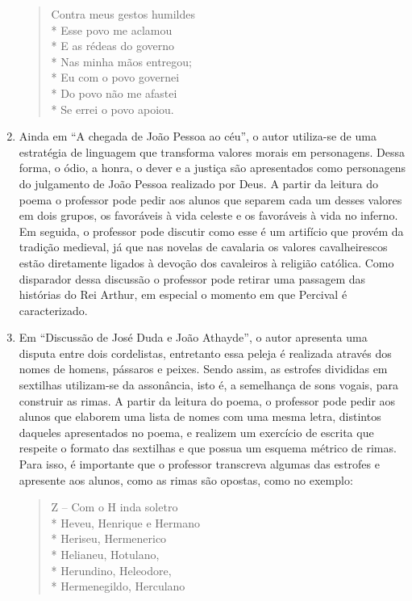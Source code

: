 \begin{enumerate}
\begin{verse}


Contra meus gestos humildes\\*
Esse povo me aclamou\\*
E as rédeas do governo\\*
Nas minha mãos entregou;\\*
Eu com o povo governei\\*
Do povo não me afastei\\*
Se errei o povo apoiou.

\end{verse}

\item Ainda em ``A chegada de João Pessoa ao
céu'', o autor utiliza-se de uma estratégia de
linguagem que transforma valores morais em personagens. Dessa forma, o
ódio, a honra, o dever e a justiça são apresentados como personagens do
julgamento de João Pessoa realizado por Deus. A partir da leitura do
poema o professor pode pedir aos alunos que separem cada um desses
valores em dois grupos, os favoráveis à vida celeste e os favoráveis à
vida no inferno. Em seguida, o professor pode discutir como esse é um
artifício que provém da tradição medieval, já que nas novelas de
cavalaria os valores cavalheirescos estão diretamente ligados à
devoção dos cavaleiros à religião católica. Como disparador dessa
discussão o professor pode retirar uma passagem das histórias do Rei
Arthur, em especial o momento em que Percival é caracterizado.

\item Em ``Discussão de José Duda e João
Athayde'', o autor apresenta uma disputa entre dois
cordelistas, entretanto essa peleja é realizada através dos nomes de
homens, pássaros e peixes. Sendo assim, as estrofes divididas em
sextilhas utilizam-se da assonância, isto é, a semelhança de sons vogais,
para construir as rimas. A partir da leitura do poema, o professor pode
pedir aos alunos que elaborem uma lista de nomes com uma mesma letra,
distintos daqueles apresentados no poema, e realizem um exercício de
escrita que respeite o formato das sextilhas e que possua um esquema
métrico de rimas. Para isso, é importante que o professor transcreva
algumas das estrofes e apresente aos alunos, como as rimas são
opostas, como no exemplo:

\begin{verse}

Z -- Com o H inda soletro\\*
Heveu, Henrique e Hermano\\*
Heriseu, Hermenerico\\*
Helianeu, Hotulano,\\*
Herundino, Heleodore,\\*
Hermenegildo, Herculano


\end{verse}
\end{enumerate}
